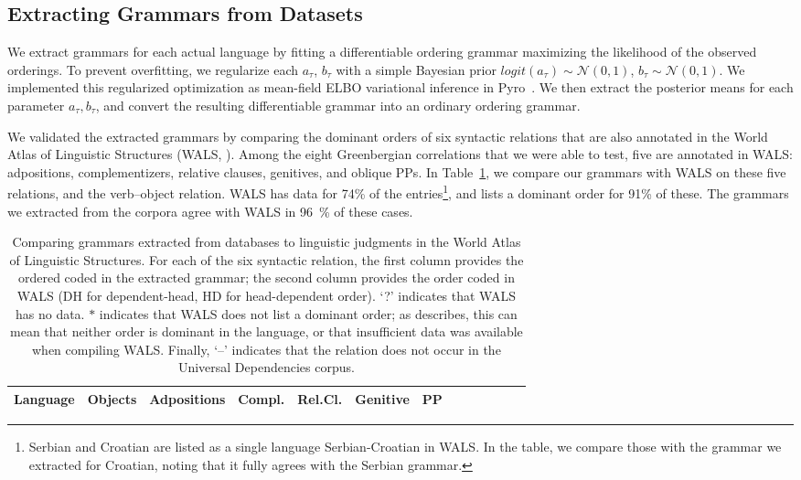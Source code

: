 \documentclass[10pt,twoside,lineno]{article}
\begin{document}
\subsection{Extracting Grammars from Datasets}\label{sec:extract-grammars}
We extract grammars for each actual language by fitting a differentiable ordering grammar maximizing the likelihood of the observed orderings.
To prevent overfitting, we regularize each $a_\tau$, $b_\tau$ with a simple Bayesian prior $logit(a_\tau) \sim \mathcal{N}(0,1)$, $b_\tau \sim \mathcal{N}(0,1)$.
We implemented this regularized optimization as mean-field ELBO variational inference in Pyro~\cite{bingham2018pyro}.
We then extract the posterior means for each parameter $a_\tau, b_\tau$, and convert the resulting differentiable grammar into an ordinary ordering grammar.




We validated the extracted grammars by comparing the dominant orders of six syntactic relations that are also annotated in the World Atlas of Linguistic Structures (WALS, \cite{haspelmath2005world}).
Among the eight Greenbergian correlations that we were able to test, five are annotated in WALS: adpositions, complementizers, relative clauses, genitives, and oblique PPs.
In Table~\ref{tab:grammars-wals}, we compare our grammars with WALS on these five relations, and the verb--object relation.
WALS has data for 74\% of the entries\footnote{Serbian and Croatian are listed as a single language Serbian-Croatian in WALS. In the table, we compare those with the grammar we extracted for Croatian, noting that it fully agrees with the Serbian grammar.}, and lists a dominant order for 91\% of these.
The grammars we extracted from the corpora agree with WALS in 96~\%  of these cases.




\begin{table}
\small{
\begin{center}
\begin{tabular}{l||ll|ll|ll|ll|ll|ll|llllll}
		   Language 
		   &	\multicolumn{2}{c|}{Objects} 
		   &	\multicolumn{2}{c|}{Adpositions} 
		   &	\multicolumn{2}{c|}{Compl.} 
		   &	\multicolumn{2}{c|}{Rel.Cl.} 
		   &	\multicolumn{2}{c|}{Genitive} 
		   &	\multicolumn{2}{c|}{PP}  \\ \hline\hline
	
\end{tabular}
\end{center}
}
\caption{Comparing grammars extracted from databases to linguistic judgments in the World Atlas of Linguistic Structures. For each of the six syntactic relation, the first column provides the ordered coded in the extracted grammar; the second column provides the order coded in WALS (DH for dependent-head, HD for head-dependent order). `?' indicates that WALS has no data.
$*$ indicates that WALS does not list a dominant order; as \citet{dryer2011evidence} describes, this can mean that neither order is dominant in the language, or that insufficient data was available when compiling WALS.
Finally, `--' indicates that the relation does not occur in the Universal Dependencies corpus.
}\label{tab:grammars-wals}
\end{table}
\end{document}
